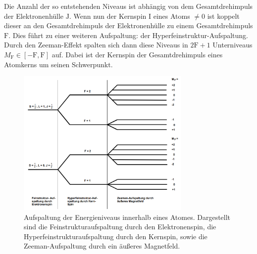 \documentclass[
  bibliography=totoc,     %
  captions=tableheading,  %
  titlepage=firstiscover, %
]{scrartcl}
\begin{document}
Die Anzahl der so entstehenden Niveaus ist abhängig von dem Gesamtdrehimpuls der
Elektronenhülle $\mathup{J}$. Wenn nun der Kernspin $\mathup{I}$ eines Atoms $\neq 0$
ist koppelt dieser an den Gesamtdrehimpuls der Elektronenhülle zu einem Gesamtdrehimpuls
$\mathup{F}$. Dies führt zu einer weiteren Aufspaltung: der Hyperfeinstruktur-Aufspaltung.
Durch den Zeeman-Effekt spalten sich dann diese Niveaus in $2\mathup{F}+1$ Unterniveaus
$M_{\mathup{F}}\in[-\mathup{F},\mathup{F}]$ auf.
Dabei ist der Kernspin der Gesamtdrehimpuls eines Atomkerns um seinen Schwerpunkt.
%
\begin{figure}[h]
  \centering
  \includegraphics[width=0.75\textwidth]{Aufspaltung.jpg}
  \caption{Aufspaltung der Energieniveaus innerhalb eines Atomes. Dargestellt
  sind die Feinstrukturaufspaltung durch den Elektronenspin, die
  Hyperfeinstrukturaufspaltung durch den Kernspin, sowie die Zeeman-Aufspaltung
  durch ein äußeres Magnetfeld. \cite{anleitung}}
  \label{fig:aufspaltung}
\end{figure}
\end{document}
